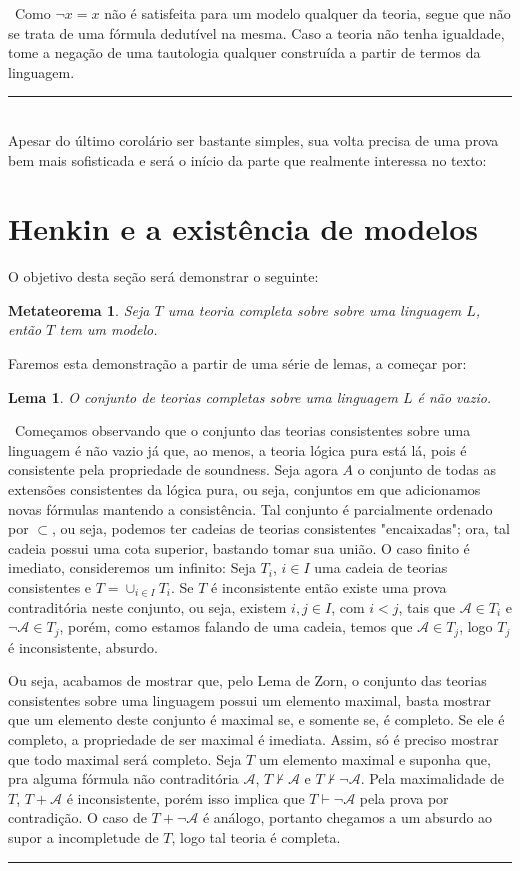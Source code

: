 \documentclass[11pt,a4paper]{article}
\newtheorem{lem}[mydef]{Lema}
\newtheorem{mthrm}[mydef]{Metateorema}
\def\dem{\par\smallbreak\noindent {\textit{ Demonstração:}} \ }
\def\eop{\hfill\rule{2.5mm}{2.5mm} \\ }
\theoremstyle{definition}
\begin{document}
\dem Como $\neg x=x$ não é satisfeita para um modelo qualquer da teoria, segue que não se trata de uma fórmula dedutível na mesma. Caso a teoria não tenha igualdade, tome a negação de uma tautologia qualquer construída a partir de termos da linguagem. \eop

Apesar do último corolário ser bastante simples, sua volta precisa de uma prova bem mais sofisticada e será o início da parte que realmente interessa no texto:

\section{Henkin e a existência de modelos}

O objetivo desta seção será demonstrar o seguinte:

\begin{mthrm}
	
	Seja $T$ uma teoria completa sobre sobre uma linguagem $L$, então $T$ tem um modelo. 
	
\end{mthrm}

Faremos esta demonstração a partir de uma série de lemas, a começar por:  

\begin{lem}
	
	O conjunto de teorias completas sobre uma linguagem $L$ é não vazio.
	
\end{lem}

\dem Começamos observando que o conjunto das teorias consistentes sobre uma linguagem é não vazio já que, ao menos, a teoria lógica pura está lá, pois é consistente pela propriedade de soundness. Seja agora $A$ o conjunto de todas as extensões consistentes da lógica pura, ou seja, conjuntos em que adicionamos novas fórmulas mantendo a consistência. Tal conjunto é parcialmente ordenado por $\subset$, ou seja, podemos ter cadeias de teorias consistentes "encaixadas"; ora, tal cadeia possui uma cota superior, bastando tomar sua união. O caso finito é imediato, consideremos um infinito: Seja $T_i$, $i\in I$ uma cadeia de teorias consistentes e $T=\cup_{i\in I}T_i$. Se $T$ é inconsistente então existe uma prova contraditória neste conjunto, ou seja, existem $i,j\in I$, com $i<j$, tais que $\mathscr{A}\in T_i$ e $\neg \mathscr{A}\in T_j$, porém, como estamos falando de uma cadeia, temos que $\mathscr{A}\in T_j$, logo $T_j$ é inconsistente, absurdo. 

Ou seja, acabamos de mostrar que, pelo Lema de Zorn, o conjunto das teorias consistentes sobre uma linguagem possui um elemento maximal, basta mostrar que um elemento deste conjunto é maximal se, e somente se, é completo. Se ele é completo, a propriedade de ser maximal é imediata. Assim, só é preciso mostrar que todo maximal será completo. Seja $T$ um elemento maximal e suponha que, pra alguma fórmula não contraditória $\mathscr{A}$, $T\nvdash \mathscr{A}$ e $T\nvdash \neg \mathscr{A}$. Pela maximalidade de $T$, $T+\mathscr{A}$ é inconsistente, porém isso implica que $T\vdash \neg \mathscr{A}$ pela prova por contradição. O caso de $T+\neg \mathscr{A}$ é análogo, portanto chegamos a um absurdo ao supor a incompletude de $T$, logo tal teoria é completa. \eop
\end{document}
